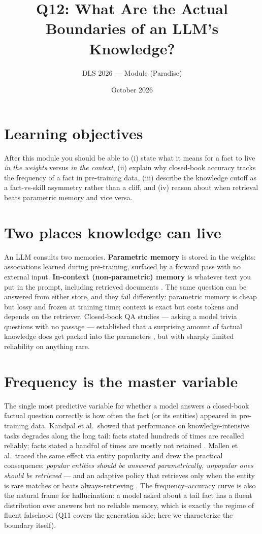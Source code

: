 \documentclass[11pt]{article}
\title{Q12: What Are the Actual Boundaries of an LLM's Knowledge?}
\author{DLS 2026 --- Module (Paradise)}
\date{October 2026}
\begin{document}
\maketitle

\section*{Learning objectives}
After this module you should be able to (i) state what it means for a fact to live \emph{in the weights} versus \emph{in the context}, (ii) explain why closed-book accuracy tracks the frequency of a fact in pre-training data, (iii) describe the knowledge cutoff as a fact-vs-skill asymmetry rather than a cliff, and (iv) reason about when retrieval beats parametric memory and vice versa.

\section{Two places knowledge can live}
An LLM consults two memories. \textbf{Parametric memory} is stored in the weights: associations learned during pre-training, surfaced by a forward pass with no external input. \textbf{In-context (non-parametric) memory} is whatever text you put in the prompt, including retrieved documents \cite{lewis2020rag,guu2020realm}. The same question can be answered from either store, and they fail differently: parametric memory is cheap but lossy and frozen at training time; context is exact but costs tokens and depends on the retriever. Closed-book QA studies --- asking a model trivia questions with no passage --- established that a surprising amount of factual knowledge does get packed into the parameters \cite{roberts2020closedbook}, but with sharply limited reliability on anything rare.

\section{Frequency is the master variable}
The single most predictive variable for whether a model answers a closed-book factual question correctly is how often the fact (or its entities) appeared in pre-training data. Kandpal et al.\ showed that performance on knowledge-intensive tasks degrades along the long tail: facts stated hundreds of times are recalled reliably; facts stated a handful of times are mostly not retained \cite{kandpal2023longtail}. Mallen et al.\ traced the same effect via entity popularity and drew the practical consequence: \emph{popular entities should be answered parametrically, unpopular ones should be retrieved} --- and an adaptive policy that retrieves only when the entity is rare matches or beats always-retrieving \cite{mallen2023popqa}. The frequency--accuracy curve is also the natural frame for hallucination: a model asked about a tail fact has a fluent distribution over answers but no reliable memory, which is exactly the regime of fluent falsehood (Q11 covers the generation side; here we characterize the boundary itself).
\end{document}
